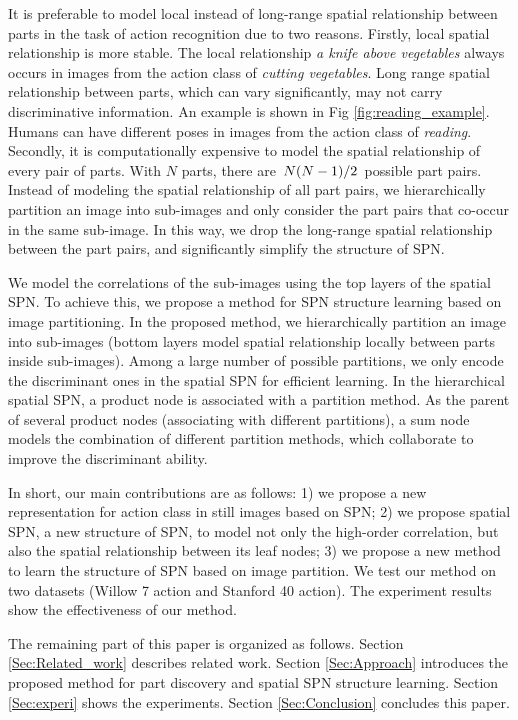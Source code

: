 \documentclass[journal]{IEEEtran}
\begin{document}
\newcommand{\slfrac}[2]{\left.#1\middle/#2\right.}

It is preferable to model local instead of long-range spatial relationship between parts in the task of action recognition due to two reasons.
Firstly, local spatial relationship is more stable. The local relationship \textit{a knife above vegetables} always occurs in images from the action class of \textit{cutting vegetables}. Long range spatial relationship between parts, which can vary significantly, may not carry discriminative information. An example is shown in Fig \ref{fig:reading_example}. Humans can have different poses in images from the action class of \textit{reading}.
Secondly, it is computationally expensive to model the spatial relationship of every pair of parts.
With $ N $ parts, there are $\slfrac{N(N-1)}{2} $ possible part pairs. Instead of modeling the spatial relationship of all part pairs, we hierarchically partition an image into sub-images and only consider the part pairs that co-occur in the same sub-image. In this way, we drop the long-range spatial relationship between the part pairs, and significantly simplify the structure of SPN.


We model the correlations of the sub-images using the top layers of the spatial SPN. To achieve this, we propose a method for SPN structure learning based on image partitioning.
In the proposed method, we hierarchically partition an image into sub-images (bottom layers model spatial relationship locally between parts inside sub-images). Among a large number of possible partitions, we only encode the discriminant ones in the spatial SPN for efficient learning. In the hierarchical spatial SPN, a product node is associated with a partition method. As the parent of several product nodes (associating with different partitions), a sum node models the combination of different partition methods, which collaborate to improve the discriminant ability.



In short, our main contributions are as follows:
1) we propose a new representation for action class in still images based on SPN;
2) we propose spatial SPN, a new structure of SPN, to model not only the high-order correlation, but also the spatial relationship between its leaf nodes;
3) we propose a new method to learn the structure of SPN based on image partition.
We test our method on two datasets (Willow 7 action and Stanford 40 action). The experiment results show the effectiveness of our method.


The remaining part of this paper is organized as follows. Section \ref{Sec:Related_work} describes related work. Section \ref{Sec:Approach} introduces the proposed method for part discovery and spatial SPN structure learning. Section \ref{Sec:experi} shows the experiments. Section \ref{Sec:Conclusion} concludes this paper.
\end{document}
